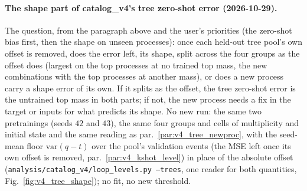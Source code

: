 \documentclass[11pt]{article}
\newcommand{\code}[1]{\texttt{#1}}
\begin{document}
\paragraph{The shape part of catalog\_v4's tree zero-shot error (2026-10-29).}\label{par:v4_tree_shape} The question,
from the paragraph above and the user's priorities (the zero-shot bias first, then the shape on unseen processes): once
each held-out tree pool's own offset is removed, does the error left, its shape, split across the four groups as the
offset does (largest on the top processes at no trained top mass, the new combinations with the top processes at
another mass), or does a new process carry a shape error of its own. If it splits as the offset, the tree zero-shot
error is the untrained top mass in both parts; if not, the new process needs a fix in the target or inputs for what
predicts its shape. No new run: the same two pretrainings (seeds $42$ and $43$), the same four groups and cells of
multiplicity and initial state and the same reading as par.~\ref{par:v4_tree_newproc}, with the seed-mean floor
$\mathrm{var}(q-t)$ over the pool's validation events (the MSE left once its own offset is removed, par.~\ref{par:v4_kshot_level})
in place of the absolute offset (\code{analysis/catalog\_v4/loop\_levels.py --trees}, one reader for both quantities,
Fig.~\ref{fig:v4_tree_shape}); no fit, no new threshold.
\end{document}
